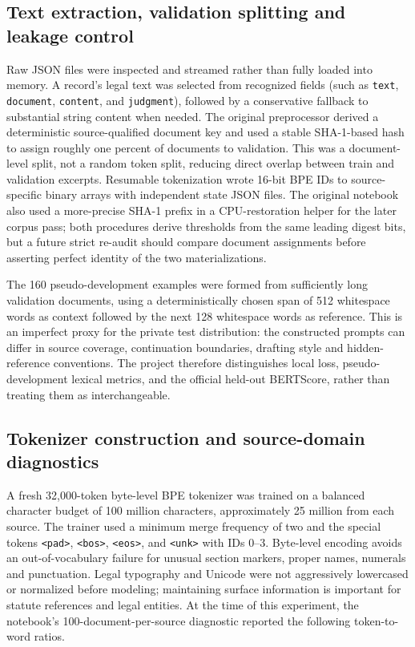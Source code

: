\documentclass[11pt,a4paper]{article}
\newcommand{\method}[1]{\texttt{#1}}
\begin{document}
\subsection{Text extraction, validation splitting and leakage control}
Raw JSON files were inspected and streamed rather than fully loaded into memory. A record's legal text was selected from recognized fields (such as \method{text}, \method{document}, \method{content}, and \method{judgment}), followed by a conservative fallback to substantial string content when needed. The original preprocessor derived a deterministic source-qualified document key and used a stable SHA-1-based hash to assign roughly one percent of documents to validation. This was a document-level split, not a random token split, reducing direct overlap between train and validation excerpts. Resumable tokenization wrote 16-bit BPE IDs to source-specific binary arrays with independent state JSON files. The original notebook also used a more-precise SHA-1 prefix in a CPU-restoration helper for the later corpus pass; both procedures derive thresholds from the same leading digest bits, but a future strict re-audit should compare document assignments before asserting perfect identity of the two materializations.

The 160 pseudo-development examples were formed from sufficiently long validation documents, using a deterministically chosen span of 512 whitespace words as context followed by the next 128 whitespace words as reference. This is an imperfect proxy for the private test distribution: the constructed prompts can differ in source coverage, continuation boundaries, drafting style and hidden-reference conventions. The project therefore distinguishes local loss, pseudo-development lexical metrics, and the official held-out BERTScore, rather than treating them as interchangeable.

\subsection{Tokenizer construction and source-domain diagnostics}
A fresh 32,000-token byte-level BPE tokenizer was trained on a balanced character budget of 100 million characters, approximately 25 million from each source. The trainer used a minimum merge frequency of two and the special tokens \method{<pad>}, \method{<bos>}, \method{<eos>}, and \method{<unk>} with IDs 0--3. Byte-level encoding avoids an out-of-vocabulary failure for unusual section markers, proper names, numerals and punctuation. Legal typography and Unicode were not aggressively lowercased or normalized before modeling; maintaining surface information is important for statute references and legal entities. At the time of this experiment, the notebook's 100-document-per-source diagnostic reported the following token-to-word ratios.
\end{document}
